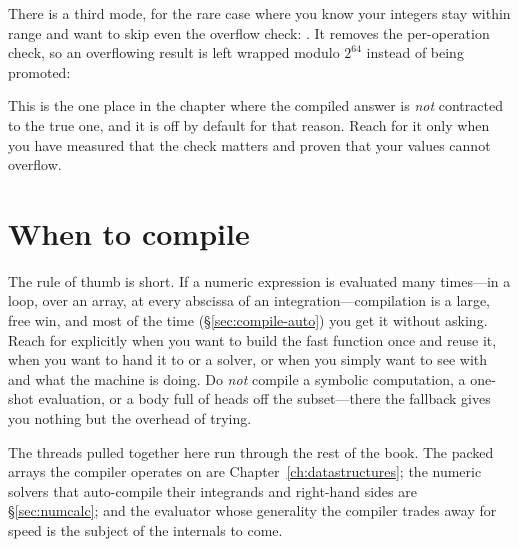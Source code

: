 There is a third mode, for the rare case where you know your integers stay within
range and want to skip even the overflow check: .
It removes the per-operation check, so an overflowing result is left wrapped
modulo \(2^{64}\) instead of being promoted:

\begin{codepairs}
\end{codepairs}

\noindent This is the one place in the chapter where the compiled answer is
\emph{not} contracted to the true one, and it is off by default for that reason.
Reach for it only when you have measured that the check matters and proven that
your values cannot overflow.


\section{When to compile}
\label{sec:compile-when}

The rule of thumb is short. If a numeric expression is evaluated many times---in a
loop, over an array, at every abscissa of an integration---compilation is a large,
free win, and most of the time (\S\ref{sec:compile-auto}) you get it without
asking. Reach for  explicitly when you want to build the fast
function once and reuse it, when you want to hand it to  or a solver, or
when you simply want to see with  and 
what the machine is doing. Do \emph{not} compile a symbolic computation, a
one-shot evaluation, or a body full of heads off the subset---there the fallback
gives you nothing but the overhead of trying.

The threads pulled together here run through the rest of the book. The packed
arrays the compiler operates on are Chapter~\ref{ch:datastructures}; the numeric
solvers that auto-compile their integrands and right-hand sides are
\S\ref{sec:numcalc}; and the evaluator whose generality the compiler trades away
for speed is the subject of the internals to come.
